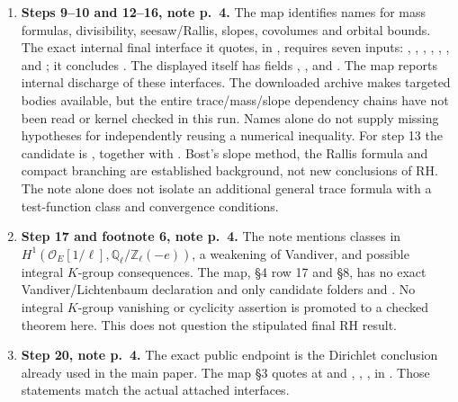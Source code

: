 \documentclass[11pt,a4paper]{article}
\theoremstyle{definition}
\begin{document}
\begin{enumerate}
\item \textbf{Steps 9--10 and 12--16, note p.~4.}
The map identifies names for mass formulas, divisibility, seesaw/Rallis,
slopes, covolumes and orbital bounds.  The exact internal final interface it
quotes, in
,
requires seven inputs: ,
, ,
, , ,
and ; it concludes .
The displayed  itself has fields
, , and
.  The map reports internal discharge of these
interfaces.  The downloaded archive makes targeted bodies available, but the
entire trace/mass/slope dependency chains have not been read or kernel
checked in this run.  Names alone do not supply missing hypotheses for
independently reusing a numerical inequality.
For step 13 the candidate is
,
together with .
Bost's slope method, the Rallis formula and compact branching are established
background, not new conclusions of RH.  The note alone does not isolate an
additional general trace formula with a test-function class and convergence
conditions.

\item \textbf{Step 17 and footnote 6, note p.~4.}
The note mentions classes in
\(H^1(\mathcal O_E[1/\ell],\mathbb Q_\ell/\mathbb Z_\ell(-e))\), a
weakening of Vandiver, and possible integral \(K\)-group consequences.
The map, \S4 row 17 and \S8, has no exact Vandiver/Lichtenbaum declaration and
only candidate folders 
and .
No integral \(K\)-group vanishing or cyclicity assertion is promoted to a
checked theorem here.  This does not question the stipulated final RH result.

\item \textbf{Step 20, note p.~4.}
The exact public endpoint is the Dirichlet conclusion already used in the
main paper.  The map \S3 quotes
 at
and , , ,
 in .
Those statements match the actual attached  interfaces.
\end{enumerate}
\end{document}
